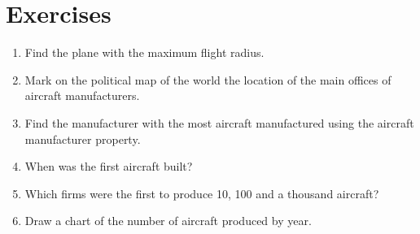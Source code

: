 
\section{Exercises}

\begin{enumerate}
\item Find the plane with the maximum flight radius.
\item Mark on the political map of the world the location of the main offices of aircraft manufacturers.
\item Find the manufacturer with the most aircraft manufactured using the aircraft manufacturer property.
\item When was the first aircraft built?
\item Which firms were the first to produce 10, 100 and a thousand aircraft?
\item Draw a chart of the number of aircraft produced by year.
\end{enumerate}
